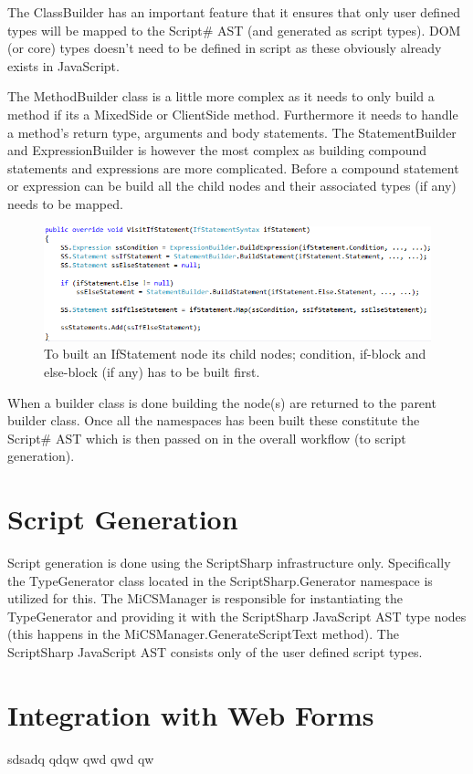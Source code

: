 	The ClassBuilder has an important feature that it ensures that only user defined types will be mapped to the Script\# AST (and generated as script types). DOM (or core) types doesn’t need to be defined in script as these obviously already exists in JavaScript.

	The MethodBuilder class is a little more complex as it needs to only build a method if its a MixedSide or ClientSide method. Furthermore it needs to handle a method’s return type, arguments and body statements. The StatementBuilder and ExpressionBuilder is however the most complex as building compound statements and expressions are more complicated. Before a compound statement or expression can be build all the child nodes and their associated types (if any) needs to be mapped.

	\begin{figure}[H]
		\begin{center}
			\centerline{\includegraphics[width=16cm]{resources/images/VisitIfStatement.png}}
		\end{center}
		\caption{To built an IfStatement node its child nodes; condition, if-block and else-block (if any) has to be built first.}
		\label{visitIfStatement}
	\end{figure}

	When a builder class is done building the node(s) are returned to the parent builder class. Once all the namespaces has been built these constitute the Script\# AST which is then passed on in the overall workflow (to script generation).

\section{Script Generation} %
\label{sec:script_generation}
	Script generation is done using the ScriptSharp infrastructure only. Specifically the TypeGenerator class located in the ScriptSharp.Generator namespace is utilized for this. The MiCSManager is responsible for instantiating the TypeGenerator and providing it with the ScriptSharp JavaScript AST type nodes (this happens in the MiCSManager.GenerateScriptText method). The ScriptSharp JavaScript AST consists only of the user defined script types.

\section{Integration with Web Forms} %
\label{sec:integration_with_web_forms}
	sdsadq qdqw qwd qwd qw 
